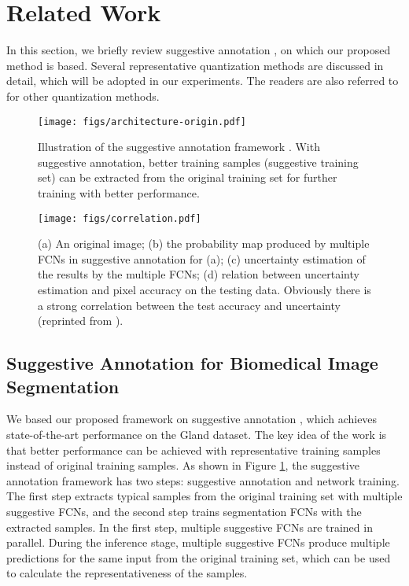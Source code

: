 \documentclass[10pt,twocolumn,letterpaper]{article}
\begin{document}
\section{Related Work}
In this section, we briefly review suggestive annotation \cite{yang2017suggestive}, on which our proposed method is based.
Several representative quantization methods are discussed in detail, which will be adopted in our experiments.
The readers are also referred to \cite{han2015deep,courbariaux2015binaryconnect,rastegari2016xnor} for other quantization methods.

\begin{figure}
\begin{center}
\centerline{\texttt{[image: figs/architecture-origin.pdf]}}
\end{center}
\vspace{-20pt}
   \caption{Illustration of the suggestive annotation framework \cite{yang2017suggestive}. With suggestive annotation, better training samples (suggestive training set) can be extracted from the original training set for further training with better performance.}
\label{fig:architectureOrigin}
\end{figure}

\begin{figure}%
\begin{center}
\centerline{\texttt{[image: figs/correlation.pdf]}}
\end{center}
\vspace{-20pt}
   \caption{(a) An original image; (b) the probability map produced by multiple FCNs in suggestive annotation for (a);
(c) uncertainty estimation of the results by the multiple FCNs; (d) relation between uncertainty estimation
and pixel accuracy on the testing data. Obviously there is a strong correlation between the test accuracy and uncertainty (reprinted from \cite{yang2017suggestive}).}
\label{fig:correlation}
\vspace{-10pt}
\end{figure}



\subsection{Suggestive Annotation for Biomedical Image Segmentation}
We based our proposed framework on suggestive annotation \cite{yang2017suggestive}, which achieves state-of-the-art performance on the Gland dataset.
The key idea of the work is that better performance can be achieved with representative training samples instead of original training samples.
As shown in Figure \ref{fig:architectureOrigin}, the suggestive annotation framework \cite{yang2017suggestive} has two steps: suggestive annotation and network training.
The first step extracts typical samples from the original training set with multiple suggestive FCNs, and the second step trains segmentation FCNs with the extracted samples.
In the first step, multiple suggestive FCNs are trained in parallel.
During the inference stage, multiple suggestive FCNs produce multiple predictions for the same input from the original training set, which can be used to calculate the representativeness of the samples.
\end{document}
